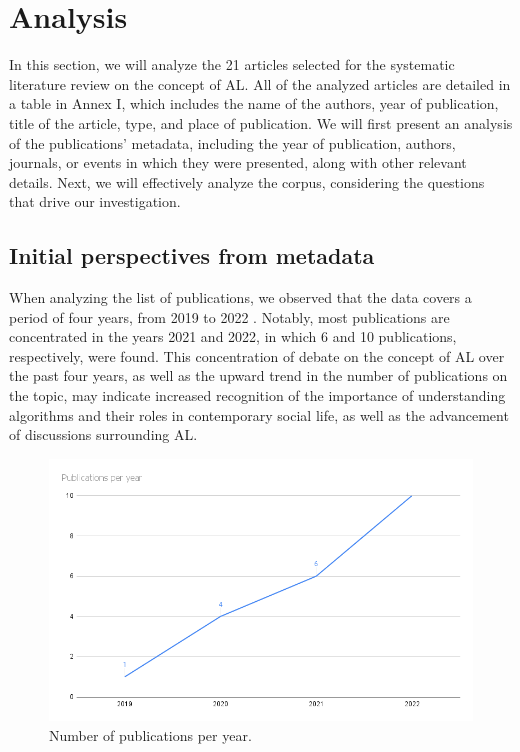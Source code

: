 \section{Analysis}\label{sec-análise}

In this section, we will analyze the 21 articles selected for the systematic literature review on the concept of AL. All of the analyzed articles are detailed in a table in Annex I, which includes the name of the authors, year of publication, title of the article, type, and place of publication. We will first present an analysis of the publications' metadata, including the year of publication, authors, journals, or events in which they were presented, along with other relevant details. Next, we will effectively analyze the corpus, considering the questions that drive our investigation.

\subsection{Initial perspectives from metadata}

When analyzing the list of publications, we observed that the data covers a period of four years, from 2019 to 2022 . Notably, most publications are concentrated in the years 2021 and 2022, in which 6 and 10 publications, respectively, were found. This concentration of debate on the concept of AL over the past four years, as well as the upward trend in the number of publications on the topic, may indicate increased recognition of the importance of understanding algorithms and their roles in contemporary social life, as well as the advancement of discussions surrounding AL.

\begin{figure}[!h]
\centering
\begin{minipage}{0.85\linewidth}
\caption{Number of publications per year.}
\label{image-02}
\includegraphics[width=\linewidth]{image2_en.png}
\end{minipage}
\end{figure}

